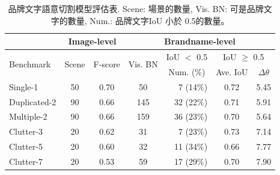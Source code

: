\begin{table}[tb]
\centering
\caption{品牌文字語意切割模型評估表. Scene: 場景的數量, Vis. BN: 可是品牌文字的數量, Num.: 品牌文字IoU 小於 0.5的數量。}
\label{tbl:segmentation}
\tabcolsep=4pt
\begin{tabular}{l|cc|crcc}
\hline
                               & \multicolumn{2}{c|}{Image-level}                         & \multicolumn{4}{c}{Brandname-level}                                                                                        \\ \hline
\multirow{2}{*}{Benchmark}     & \multirow{2}{*}{Scene}    & \multirow{2}{*}{F-score}     & \multirow{2}{*}{Vis. BN}     & \multicolumn{1}{|c|}{IoU $<$ 0.5} & \multicolumn{2}{c}{IoU $\ge$ 0.5}                                  \\ \cline{5-7}
                               &                           &                              &                         & \multicolumn{1}{|c|}{Num. (\%)}        & \multicolumn{1}{c|}{Ave. IoU} & \multicolumn{1}{c}{$\Delta$$\theta$} \\ \hline
Single-1                       & 50                        & 0.70                & 50                      & 7  (14\%)                         & 0.72                          &  5.45                               \\
Duplicated-2                   & 90                        & 0.66                         & 145                     & 32 (22\%)                         & 0.71                          &  5.91                               \\
Multiple-2                     & 90                        & 0.66                         & 159                     & 36 (23\%)                         & 0.70                          &  5.64                               \\
Clutter-3                      & 20                        & 0.62                         & 31                      & 7  (23\%)                         & 0.73                          &  7.14                               \\
Clutter-5                      & 20                        & 0.60                         & 32                      & 11 (34\%)                         & 0.66                          &  7.77                               \\
Clutter-7                      & 20                        & 0.53                         & 59                      & 17 (29\%)                         & 0.70                          &  7.90                               \\ \hline
\end{tabular}
\end{table}

